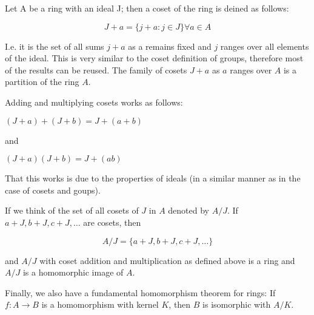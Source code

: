 
Let A be a ring with an ideal J; then a coset of the ring is deined as
follows:

\[
J + a = \{j + a: j \in J \} \forall a \in A
\]

I.e. it is the set of all sums \(j+a\) as a remains fixed and \(j\)
ranges over all elements of the ideal. This is very similar to the coset
definition of groups, therefore most of the results can be reused. The
family of cosets \(J+a\) as \(a\) ranges over \(A\) is a partition of
the ring \(A\).

Adding and multiplying cosets works as follows:

\((J + a) + (J + b) = J + (a+b)\)

and

\((J + a) (J + b) = J + (ab)\)

That this works is due to the properties of ideals (in a similar manner
as in the case of cosets and goups).

If we think of the set of all cosets of \(J\) in \(A\) denoted by
\(A/J\). If \(a+J, b+J, c+J,\ldots\) are cosets, then

\[
A/J = \{a+J, b+J, c+J, \ldots \}
\]

and \(A/J\) with coset addition and multiplication as defined above is a
ring and \(A/J\) is a homomorphic image of \(A\).

Finally, we also have a fundamental homomorphism theorem for rings: If
\(f: A \rightarrow B\) is a homomorphism with kernel \(K\), then \(B\)
is isomorphic with \(A/K\).
